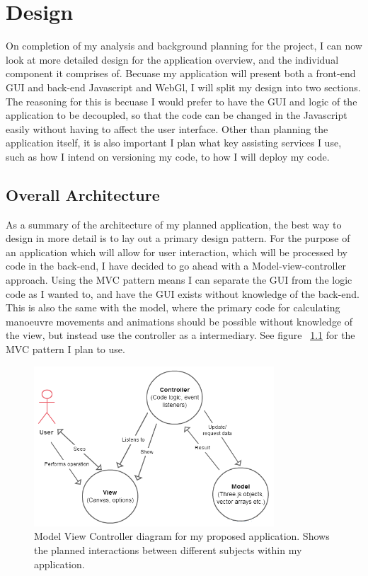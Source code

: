 \chapter{Design}
On completion of my analysis and background planning for the project, I can now look at more detailed design for the application overview, and the individual component it comprises of. Becuase my application will present both a front-end GUI and back-end Javascript and WebGl, I will split my design into two sections. The reasoning for this is becuase I would prefer to have the GUI and logic of the application to be decoupled, so that the code can be changed in the Javascript easily without having to affect the user interface. Other than planning the application itself, it is also important I plan what key assisting services I use, such as how I intend on versioning my code, to how I will deploy my code.

\section{Overall Architecture}
As a summary of the architecture of my planned application, the best way to design in more detail is to lay out a primary design pattern. For the purpose of an application which will allow for user interaction, which will be processed by code in the back-end, I have decided to go ahead with a Model-view-controller approach. Using the MVC pattern means I can separate the GUI from the logic code as I wanted to, and have the GUI exists without knowledge of the back-end. This is also the same with the model, where the primary code for calculating manoeuvre movements and animations should be possible without knowledge of the view, but instead use the controller as a intermediary. See figure ~\ref{fig:mvc} for the MVC pattern I plan to use. 

\begin{figure}[h!]
  \centering
      \includegraphics[width=0.8\textwidth]{images/mvc.png}
  \caption{Model View Controller diagram for my proposed application. Shows the planned interactions between different subjects within my application.}
  \label{fig:mvc}
\end{figure}


